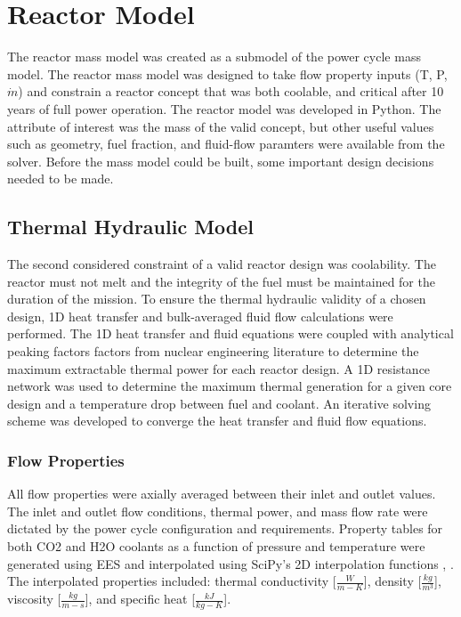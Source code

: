\chapter{Reactor Model} \label{ch:mass_model}
The reactor mass model was created as a submodel of the power cycle mass
model. The reactor mass model was designed to take flow property inputs (T, P,
$\dot{m}$) and constrain a reactor concept that was both coolable, and critical
after 10 years of full power operation. The reactor model was developed in
Python. The attribute of interest was the mass of
the valid concept, but other useful values such as geometry, fuel fraction,
and fluid-flow paramters were available from the solver. Before the mass model
could be built, some important design decisions needed to be made.

\section{Thermal Hydraulic Model}
The second considered constraint of a valid reactor design was coolability. The reactor must
not melt and the integrity of the fuel must be maintained for the duration of
the mission. To ensure the thermal hydraulic validity of a chosen design, 
1D heat transfer and bulk-averaged fluid flow calculations were performed. The 1D
heat transfer and fluid equations were coupled with analytical peaking factors
factors from nuclear engineering literature to determine the maximum extractable
thermal power for each reactor design. A 1D resistance network was used to
determine the maximum thermal generation for a given core design and a temperature
drop between fuel and coolant. An iterative solving scheme was developed to
converge the heat transfer and fluid flow equations.

\subsection{Flow Properties}
All flow properties were axially averaged between their inlet and outlet values.
The inlet and outlet flow conditions, thermal power, and mass flow rate were
dictated by the power cycle configuration and requirements. Property tables for
both CO2 and H2O coolants as a function of pressure and temperature were 
generated using EES and interpolated using SciPy's 2D interpolation functions
\citep{scipy}, \citep{EES_citation}.
The interpolated properties included: thermal conductivity [$\frac{W}{m-K}$], density
[$\frac{kg}{m^3}$], viscosity [$\frac{kg}{m-s}$], and specific heat [$\frac{kJ}{kg-K}$].

